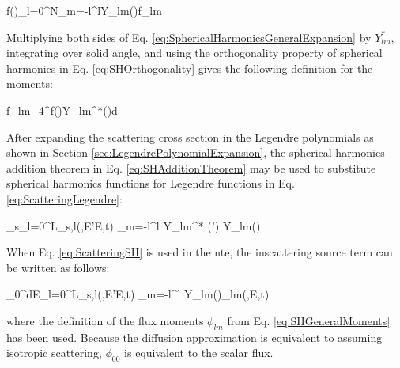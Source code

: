\beq
\label{eq:SphericalHarmonicsGeneralExpansion}
f(\hO)\equiv\sum_{l=0}^{N}\sum_{m=-l}^{l}Y_{lm}(\hO)f_{lm}
\eeq

Multiplying both sides of Eq. \eqref{eq:SphericalHarmonicsGeneralExpansion} by \(Y_{lm}^*\), integrating over solid angle, and using the orthogonality property of spherical harmonics in Eq. \eqref{eq:SHOrthogonality} gives the following definition for the moments:

\beq
\label{eq:SHGeneralMoments}
f_{lm}\equiv\int_{4\pi}^{}f(\hO)Y_{lm}^{*}(\hO)d\hO  
\eeq

After expanding the scattering cross section in the Legendre polynomials as shown in Section \ref{sec:LegendrePolynomialExpansion}, the spherical harmonics addition theorem in Eq. \eqref{eq:SHAdditionTheorem} may be used to substitute spherical harmonics functions for Legendre functions in Eq. \eqref{eq:ScatteringLegendre}:

\beq
\label{eq:ScatteringSH}
\Sigma_s\seatout \equiv\sum_{l=0}^L\Sigma_{s,l}(,E'\rightarrow E,t) \sum_{m=-l}^{l} Y_{lm}^{*} (\hO  ') Y_{lm}(\hO  )
\eeq

When Eq. \eqref{eq:ScatteringSH} is used in the \gls{nte}, the inscattering source term can be written as follows:

\beq
\label{eq:SHInscattering}
\int_0^\infty dE\sum_{l=0}^L\Sigma_{s,l}(,E'\rightarrow E,t) \sum_{m=-l}^{l}  Y_{lm}(\hO  )\phi_{lm}(,E,t)
\eeq

 where the definition of the flux moments \(\phi_{lm}\) from Eq. \eqref{eq:SHGeneralMoments} has been used. Because the diffusion approximation is equivalent to assuming isotropic scattering, \(\phi_{00}\) is equivalent to the scalar flux.
